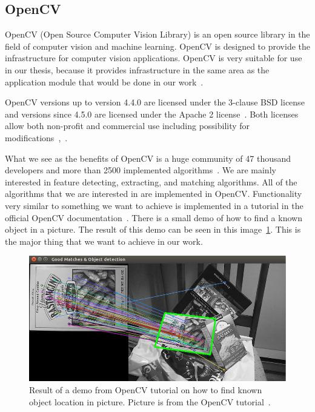 \documentclass[thesis=B,english]{FITthesis}[2019/12/23]
\begin{document}
            \subsection{OpenCV}
                OpenCV (Open Source Computer Vision Library) is an open source library in the field of computer vision and machine learning. OpenCV is designed to provide the infrastructure for computer vision applications. OpenCV is very suitable for use in our thesis, because it provides infrastructure in the same area as the application module that would be done in our work~\cite{aboutOpenCV}.
                
                OpenCV versions up to version 4.4.0 are licensed under the 3-clause BSD license and versions since 4.5.0 are licensed under the Apache 2 license~\cite{OpenCVLicense}. Both licenses allow both non-profit and commercial use including possibility for modifications~\cite{ApacheLicense2},~\cite{BSD-3-Clause}.
                
                What we see as the benefits of OpenCV is a huge community of 47 thousand developers and more than 2500 implemented algorithms~\cite{aboutOpenCV}. We are mainly interested in feature detecting, extracting, and matching algorithms. All of the algorithms that we are interested in are implemented in OpenCV. Functionality very similar to something we want to achieve is implemented in a tutorial in the official OpenCV documentation~\cite{Huaman2021}.  There is a small demo of how to find a known object in a picture. The result of this demo can be seen in this image~\ref{fig:OpenCV_Feature_Homography_Result}. This is the major thing that we want to achieve in our work.
                
                \begin{figure}
                    \centering
                    \includegraphics[width = 0.7\linewidth] {pictures/OpenCV_Feature_Homography_Result.jpg}
                    \caption[Result of a demo from OpenCV tutorial on how to find known object location in picture]{Result of a demo from OpenCV tutorial on how to find known object location in picture. Picture is from the OpenCV tutorial~\cite{Huaman2021}.}
                    \label{fig:OpenCV_Feature_Homography_Result}
                \end{figure}
                
\end{document}
